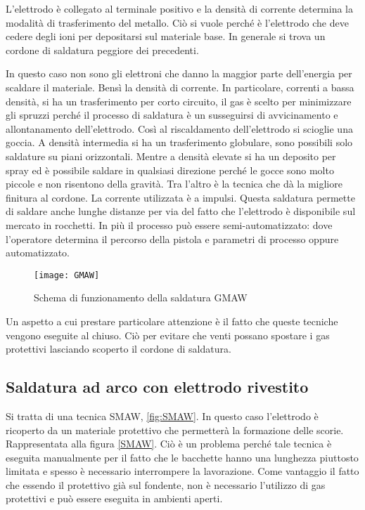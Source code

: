L'elettrodo è collegato al terminale positivo e la densità di corrente determina la modalità di trasferimento del metallo.
Ciò si vuole perché è l'elettrodo che deve cedere degli ioni per depositarsi sul materiale base. In generale si trova un cordone di saldatura peggiore dei precedenti.

In questo caso non sono gli elettroni che danno la maggior parte dell'energia per scaldare il materiale. Bensì la densità di corrente.
In particolare, correnti a bassa densità, si ha un trasferimento per corto circuito, il gas è scelto per minimizzare gli spruzzi perché il processo di saldatura è un susseguirsi di avvicinamento e allontanamento dell'elettrodo. Così al riscaldamento dell'elettrodo si scioglie una goccia.
A densità intermedia si ha un trasferimento globulare, sono possibili solo saldature su piani orizzontali.
Mentre a densità elevate si ha un deposito per spray ed è possibile saldare in qualsiasi direzione perché le gocce sono molto piccole e non risentono della gravità. Tra l'altro è la tecnica che dà la migliore finitura al cordone.
La corrente utilizzata è a impulsi.
Questa saldatura permette di saldare anche lunghe distanze per via del fatto che l'elettrodo è disponibile sul mercato in rocchetti.
In più il processo può essere semi-automatizzato: dove l'operatore determina il percorso della pistola e parametri di processo oppure automatizzato.

\begin{figure}
\centering
\texttt{[image: GMAW]}
\caption{Schema di funzionamento della saldatura \ac{GMAW}}
\label{fig:GMAW}
\end{figure}

Un aspetto a cui prestare particolare attenzione è il fatto che queste tecniche vengono eseguite al chiuso. Ciò per evitare che venti possano spostare i gas protettivi lasciando scoperto il cordone di saldatura.

\subsection{Saldatura ad arco con elettrodo rivestito}
Si tratta di una tecnica \ac{SMAW}, \ref{fig:SMAW}. In questo caso l'elettrodo è ricoperto da un materiale protettivo che permetterà la formazione delle scorie.
Rappresentata alla figura \ref{SMAW}.
Ciò è un problema perché tale tecnica è eseguita manualmente per il fatto che le bacchette hanno una lunghezza piuttosto limitata e spesso è necessario interrompere la lavorazione.
Come vantaggio il fatto che essendo il protettivo già sul fondente, non è necessario l'utilizzo di gas protettivi e può essere eseguita in ambienti aperti.

